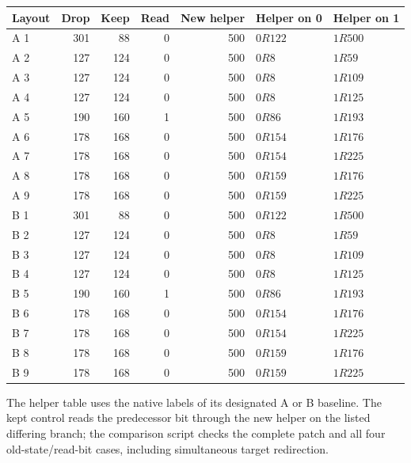 \begin{center}\small
\begin{tabular}{@{}lrrrrll@{}}
\toprule
Layout&Drop&Keep&Read&New helper&Helper on 0&Helper on 1\\
\midrule
A 1&301&88&0&500&$0R122$&$1R500$\\
A 2&127&124&0&500&$0R8$&$1R59$\\
A 3&127&124&0&500&$0R8$&$1R109$\\
A 4&127&124&0&500&$0R8$&$1R125$\\
A 5&190&160&1&500&$0R86$&$1R193$\\
A 6&178&168&0&500&$0R154$&$1R176$\\
A 7&178&168&0&500&$0R154$&$1R225$\\
A 8&178&168&0&500&$0R159$&$1R176$\\
A 9&178&168&0&500&$0R159$&$1R225$\\
B 1&301&88&0&500&$0R122$&$1R500$\\
B 2&127&124&0&500&$0R8$&$1R59$\\
B 3&127&124&0&500&$0R8$&$1R109$\\
B 4&127&124&0&500&$0R8$&$1R125$\\
B 5&190&160&1&500&$0R86$&$1R193$\\
B 6&178&168&0&500&$0R154$&$1R176$\\
B 7&178&168&0&500&$0R154$&$1R225$\\
B 8&178&168&0&500&$0R159$&$1R176$\\
B 9&178&168&0&500&$0R159$&$1R225$\\
\bottomrule
\end{tabular}
\end{center}
The helper table uses the native labels of its designated A or B baseline.
The kept control reads the predecessor bit through the new helper on the
listed differing branch; the comparison script checks the complete patch
and all four old-state/read-bit cases, including simultaneous target redirection.
